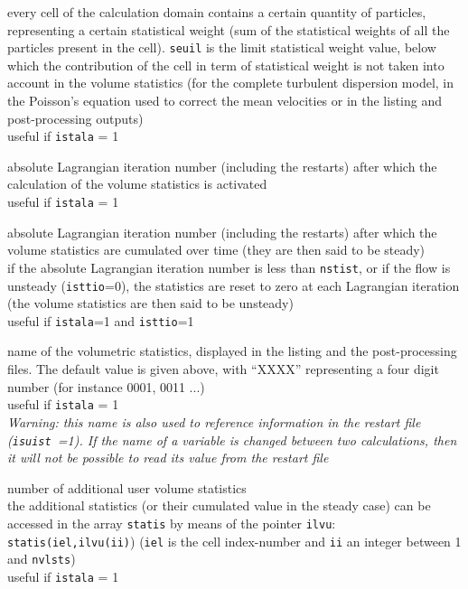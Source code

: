 {every cell of the calculation domain contains a certain quantity of
particles, representing a certain statistical weight (sum of the
statistical weights of all the particles present in the cell). \texttt{seuil}
is the limit statistical weight value, below which the contribution of the
cell in term of statistical weight is not taken into account in the volume
statistics (for the complete turbulent dispersion model, in the
Poisson's equation used to correct the mean velocities or in the listing and
post-processing outputs)\\
useful if \texttt{istala} = 1}

{absolute Lagrangian iteration number (including the restarts) after
which the calculation of the volume statistics is activated\\
useful if \texttt{istala} = 1}

{absolute Lagrangian iteration number (including the restarts) after
which the volume statistics are cumulated over time (they are then said to be
steady)\\
if the absolute Lagrangian iteration number is less than \texttt{nstist},
or if the flow is unsteady (\texttt{isttio}=0), the statistics are reset
to zero at each Lagrangian iteration (the volume statistics are then said
to be unsteady)\\
useful if \texttt{istala}=1 and \texttt{isttio}=1}

{name of the volumetric statistics, displayed in the listing
and the post-processing files. The default value is given above, with ``XXXX''
representing a four digit number (for instance 0001, 0011 ...)\\
useful if \texttt{istala} = 1\\
{\em Warning: this name is also used to reference information in the restart file
\mbox{(\texttt{isuist} =1)}. If the name of a variable is changed between two
calculations, then it will not be possible to read its value from the restart file}}

{number of additional user volume statistics\\
the additional statistics (or their cumulated value in the steady
case) can be accessed in the array \texttt{statis} by means of the pointer
\texttt{ilvu}: \texttt{statis(iel,ilvu(ii)})
(\texttt{iel} is the cell index-number and \texttt{ii} an integer between
1 and \texttt{nvlsts})\\
useful if \texttt{istala} = 1}

